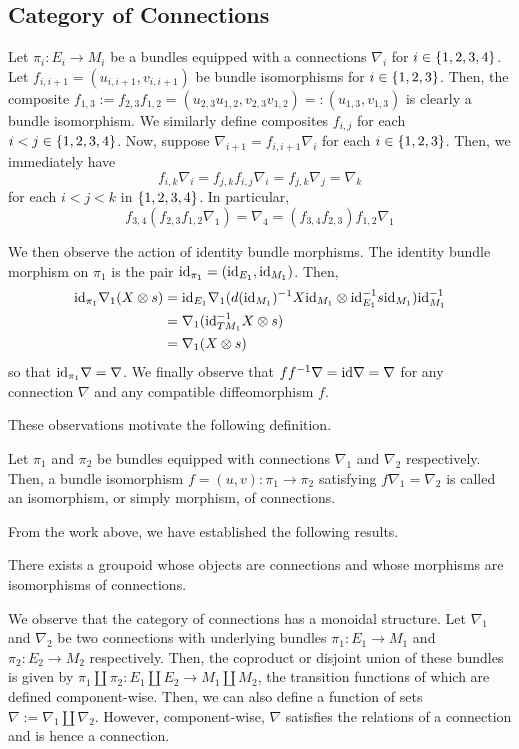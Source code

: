 \documentclass[./Thick_TQFTs_and_Quantum_Information.tex]{subfiles}
\begin{document}
\subsection{Category of Connections}

Let $\pi_i : E_i \to M_i$ be a bundles equipped with a connections $\nabla_i$
for $i \in \set{1, 2, 3, 4}$. Let $f_{i, i + 1} = (u_{i, i + 1}, v_{i, i + 1})$
be bundle isomorphisms for $i \in \set{1, 2, 3}$. Then, the composite
$f_{1, 3} := f_{2, 3}f_{1, 2} = (u_{2, 3}u_{1, 2}, v_{2, 3}v_{1, 2})
=: (u_{1, 3}, v_{1, 3})$ is clearly a bundle isomorphism. We similarly define
composites $f_{i, j}$ for each $i < j \in \set{1, 2, 3, 4}$. Now, suppose
$\nabla_{i + 1} = f_{i, i + 1}\nabla_i$ for each $i \in \set{1, 2, 3}$. Then, we
immediately have
\[
  f_{i, k}\nabla_i = f_{j, k}f_{i, j}\nabla_i = f_{j, k}\nabla_j = \nabla_k
\]
for each $i < j < k$ in $\set{1, 2, 3, 4}$. In particular,
\[
  f_{3, 4}(f_{2, 3}f_{1, 2}\nabla_1) = \nabla_4
    = (f_{3, 4}f_{2, 3})f_{1, 2}\nabla_1
\]

We then observe the action of identity bundle morphisms. The identity bundle
morphism on $\pi_1$ is the pair $\text{id}_{\pi_1} = (\text{id}_{E_1}, \text{id}_{M_1})$. Then,
\begin{align*}
   \text{id}_{\pi_1}\nabla_1(X \otimes s)
&= \text{id}_{E_1}\nabla_1(d(\text{id}_{M_1})^{-1}X\text{id}_{M_1}
                     \otimes \text{id}_{E_1}^{-1}s\text{id}_{M_1})\text{id}_{M_1}^{-1} \\
&= \nabla_1(\text{id}_{TM_1}^{-1}X \otimes s) \\
&= \nabla_1(X \otimes s)
\end{align*}
so that $\text{id}_{\pi_1}\nabla = \nabla$. We finally observe that
$ff^{-1}\nabla = \text{id}\nabla = \nabla$ for any connection $\nabla$ and any
compatible diffeomorphism $f$.

These observations motivate the following definition.
\begin{defn}
Let $\pi_1$ and $\pi_2$ be bundles equipped with connections $\nabla_1$ and
$\nabla_2$ respectively. Then, a bundle isomorphism
$f = (u, v) : \pi_1 \to \pi_2$ satisfying $f\nabla_1 = \nabla_2$ is called an
isomorphism, or simply morphism, of connections.
\end{defn}

From the work above, we have established the following results.
\begin{thm}
There exists a groupoid whose objects are connections and whose morphisms are
isomorphisms of connections.
\end{thm}

We observe that the category of connections has a monoidal structure. Let
$\nabla_1$ and $\nabla_2$ be two connections with underlying bundles
$\pi_1 : E_1 \to M_1$ and $\pi_2 : E_2 \to M_2$ respectively. Then, the
coproduct or disjoint union of these bundles is given by
$\pi_1 \amalg \pi_2 : E_1 \amalg E_2 \to M_1 \amalg M_2$, the transition
functions of which are defined component-wise. Then, we can also define a
function of sets $\nabla := \nabla_1 \amalg \nabla_2$. However, component-wise,
$\nabla$ satisfies the relations of a connection and is hence a connection.

\end{document}
